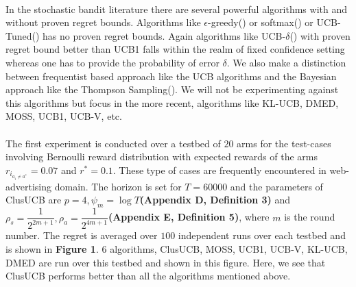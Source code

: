 \paragraph{}In the stochastic bandit literature there are several powerful algorithms with and without proven regret bounds. Algorithms like $\epsilon$-greedy(\cite{sutton1998reinforcement}) or softmax(\cite{sutton1998reinforcement}) or UCB-Tuned(\cite{auer2002finite}) has no proven regret bounds. Again algorithms like UCB-$\delta$(\cite{abbasi2011improved}) with proven regret bound better than UCB1  falls within the realm of fixed confidence setting whereas one has to provide the probability of error $\delta$. We also make a distinction between frequentist based approach like the UCB algorithms and the Bayesian approach like the Thompson Sampling(\cite{agrawal2011analysis}). We will not be experimenting against this algorithms but focus in the more recent, algorithms like KL-UCB, DMED, MOSS, UCB1, UCB-V, etc. 

\paragraph{}The first experiment is conducted over a testbed of $20$ arms for the test-cases involving Bernoulli reward distribution with expected rewards of the arms $r_{i_{a_{i}\neq a^{*}}}=0.07$ and $r^{*}=0.1$. These type of cases are frequently encountered in web-advertising domain. The horizon is set for $T=60000$ and the parameters of ClusUCB are $p=4,\psi_{m}=\log T$\textbf{(Appendix D, Definition 3)} and $\rho_{s}=\dfrac{1}{2^{2m+1}},\rho_{a}=\dfrac{1}{2^{4m+1}}$\textbf{(Appendix E, Definition 5)}, where $m$ is the round number. The regret is averaged over $100$ independent runs over each testbed and is shown in \textbf{Figure 1}. $6$ algorithms, ClusUCB, MOSS, UCB1, UCB-V, KL-UCB, DMED are run over this testbed and shown in this figure. Here, we see that ClusUCB performs better than all the algorithms mentioned above.


